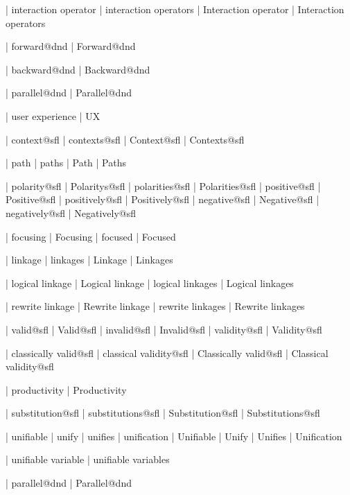  | interaction operator
 | interaction operators
 | Interaction operator
 | Interaction operators

 | forward@dnd
 | Forward@dnd

 | backward@dnd
 | Backward@dnd

 | parallel@dnd
 | Parallel@dnd


 | user experience
 | UX
 
 | context@sfl
 | contexts@sfl
 | Context@sfl
 | Contexts@sfl

 | path
 | paths
 | Path
 | Paths

 | polarity@sfl
 | Polaritys@sfl
 | polarities@sfl
 | Polarities@sfl
 | positive@sfl
 | Positive@sfl
 | positively@sfl
 | Positively@sfl
 | negative@sfl
 | Negative@sfl
 | negatively@sfl
 | Negatively@sfl

 | focusing
 | Focusing
 | focused
 | Focused

 | linkage
 | linkages
 | Linkage
 | Linkages

 | logical linkage
 | Logical linkage
 | logical linkages
 | Logical linkages

 | rewrite linkage
 | Rewrite linkage
 | rewrite linkages
 | Rewrite linkages

 | valid@sfl
 | Valid@sfl
 | invalid@sfl
 | Invalid@sfl
 | validity@sfl
 | Validity@sfl

 | classically valid@sfl
 | classical validity@sfl
 | Classically valid@sfl
 | Classical validity@sfl

 | productivity
 | Productivity
 
 | substitution@sfl
 | substitutions@sfl
 | Substitution@sfl
 | Substitutions@sfl

 | unifiable
 | unify
 | unifies
 | unification
 | Unifiable
 | Unify
 | Unifies
 | Unification

 | unifiable variable
 | unifiable variables

 | parallel@dnd
 | Parallel@dnd


